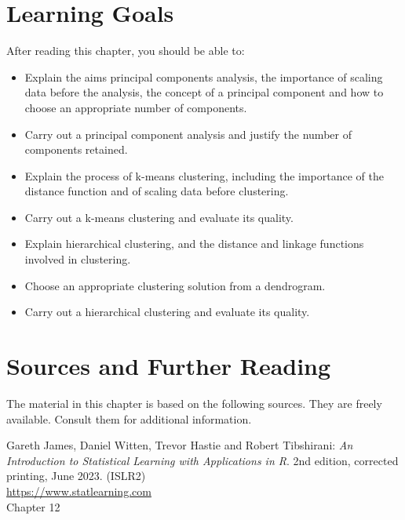 %
%
\section*{Learning Goals}

After reading this chapter, you should be able to:
\begin{itemize}
   \item Explain the aims principal components analysis, the importance of scaling data before the analysis, the concept of a principal component and how to choose an appropriate number of components.
   \item Carry out a principal component analysis and justify the number of components retained.
   \item Explain the process of k-means clustering, including the importance of the distance function and of scaling data before clustering.
   \item Carry out a k-means clustering and evaluate its quality.
   \item Explain hierarchical clustering, and the distance and linkage functions involved in clustering.
   \item Choose an appropriate clustering solution from a dendrogram.
   \item Carry out a hierarchical clustering and evaluate its quality.
\end{itemize}

\section*{Sources and Further Reading}

The material in this chapter is based on the following sources. They are freely available. Consult them for additional information.

\begin{resourcebox}
Gareth James, Daniel Witten, Trevor Hastie and Robert Tibshirani: \emph{An Introduction to Statistical Learning with Applications in R}. 2nd edition, corrected printing, June 2023. (ISLR2) \\

\small\url{https://www.statlearning.com}\normalsize \\

Chapter 12
\end{resourcebox}

